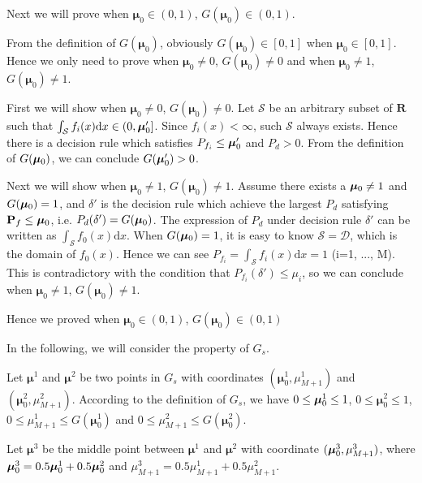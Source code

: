\documentclass[12pt,journal,a4paper,twoside,onecolumn]{IEEEtran}
\begin{document}
\begin{spacing}{2.5}
Next we will prove when $\boldsymbol{\mu}_0 \in (0, 1)$, $G(\boldsymbol{\mu}_0) \in (0, 1)$. 

From the definition of $G(\boldsymbol{\mu}_0)$, obviously $G(\boldsymbol{\mu}_0) \in  [0, 1]$ when $\boldsymbol{\mu}_0 \in [0, 1]$. Hence we only need to prove when $\boldsymbol{\mu}_0 \neq 0$, $G(\boldsymbol{\mu}_0) \neq 0$ and when  $\boldsymbol{\mu}_0 \neq 1$, $G(\boldsymbol{\mu}_0) \neq 1$.

First we will show when $\boldsymbol{\mu}_0 \neq 0$, $G(\boldsymbol{\mu}_0) \neq 0$.
Let $\mathcal{S}$ be an arbitrary subset of $\mathbf{R}$ such that $\int_{\mathcal{S}}f_i(x)\mathrm{d}x \in (0,\boldsymbol{\mu}_0' ]$. Since $f_i(x) < \infty$, such $\mathcal{S}$ always exists. Hence there is a decision rule which satisfies $P_{f_i} \leq \boldsymbol{\mu}_0'$ and $P_d > 0$. From the definition of $G(\boldsymbol{\mu}_0)$, we can conclude $G(\boldsymbol{\mu}_0') > 0 $.

Next we will show when  $\boldsymbol{\mu}_0 \neq 1$, $G(\boldsymbol{\mu}_0) \neq 1$. Assume there exists a $\boldsymbol{\mu}_0 \neq 1$ and $G(\boldsymbol{\mu}_0) = 1$, and $\delta'$ is the decision rule which achieve the largest $P_d$ satisfying $\mathbf{P}_f \leq \boldsymbol{\mu}_0$, i.e. $P_d(\delta') = G(\boldsymbol{\mu}_0)$. The expression of $P_d$ under decision rule $\delta'$ can be written as $\int_{\mathcal{S}}f_0(x)\mathrm{d}x$. When $G(\boldsymbol{\mu}_0) = 1$, it is easy to know $\mathcal{S} = \mathcal{D}$, which is the domain of $f_0(x)$. Hence we can see $P_{f_i} = \int_{\mathcal{S}}f_i(x)\mathrm{d}x = 1$ (i=1, ..., M). This is contradictory with the condition that $P_{f_i}(\delta') \leq \mu_i$, so we can conclude when  $\boldsymbol{\mu}_0 \neq 1$, $G(\boldsymbol{\mu}_0) \neq 1$.

Hence we proved when $\boldsymbol{\mu}_0 \in (0, 1)$, $G(\boldsymbol{\mu}_0) \in (0, 1)$
 
In the following, we will consider the property of $G_s$. 

Let $\boldsymbol{\mu}^1$ and  $\boldsymbol{\mu}^2$ be two points in $G_s$ with coordinates $(\boldsymbol{\mu}^1_0, \mu_{M+1}^1)$ and $(\boldsymbol{\mu}^2_0, \mu_{M+1}^2)$. According to the definition of $G_s$, we have $0 \leq \boldsymbol{\mu}_0^1 \leq 1$, $0 \leq \boldsymbol{\mu}^2_0 \leq 1$, $0 \leq \mu_{M+1}^1 \leq G(\boldsymbol{\mu}_0^1)$ and  $0 \leq \mu_{M+1}^2 \leq G(\boldsymbol{\mu}_0^2)$.

Let $\boldsymbol{\mu}^3$ be the middle point between $\boldsymbol{\mu}^1$ and $\boldsymbol{\mu}^2$ with coordinate $(\boldsymbol{\mu}_0^3, \mu_{M+1}^3)$, where  $ \boldsymbol{\mu}_0^3 = 0.5\boldsymbol{\mu}_0^1 + 0.5 \boldsymbol{\mu}_0^2$ and $\mu_{M+1}^3 = 0.5 \mu_{M+1}^1 + 0.5 \mu_{M+1}^2$. 


\end{spacing}
\end{document}
